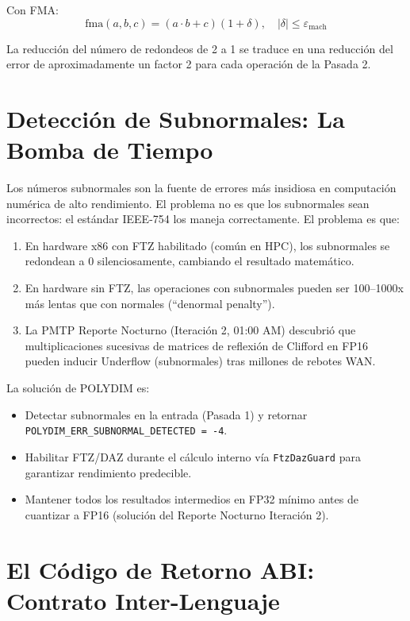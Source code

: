 Con FMA:
\begin{equation}
\text{fma}(a, b, c) = (a \cdot b + c)(1 + \delta), \quad |\delta| \le \varepsilon_{\text{mach}}
\end{equation}

La reducción del número de redondeos de 2 a 1 se traduce en una reducción del error
de aproximadamente un factor 2 para cada operación de la Pasada 2.

\section{Detección de Subnormales: La Bomba de Tiempo}

Los números subnormales son la fuente de errores más insidiosa en computación numérica
de alto rendimiento. El problema no es que los subnormales sean incorrectos: el estándar
IEEE-754 los maneja correctamente. El problema es que:

\begin{enumerate}
\item En hardware x86 con FTZ habilitado (común en HPC), los subnormales se redondean
a 0 silenciosamente, cambiando el resultado matemático.
\item En hardware sin FTZ, las operaciones con subnormales pueden ser 100--1000x más
lentas que con normales (``denormal penalty'').
\item La PMTP Reporte Nocturno (Iteración 2, 01:00 AM) descubrió que multiplicaciones
sucesivas de matrices de reflexión de Clifford en FP16 pueden inducir Underflow
(subnormales) tras millones de rebotes WAN.
\end{enumerate}

La solución de POLYDIM es:
\begin{itemize}
\item Detectar subnormales en la entrada (Pasada 1) y retornar \texttt{POLYDIM\_ERR\_SUBNORMAL\_DETECTED = -4}.
\item Habilitar FTZ/DAZ durante el cálculo interno vía \texttt{FtzDazGuard} para garantizar
rendimiento predecible.
\item Mantener todos los resultados intermedios en FP32 mínimo antes de cuantizar a FP16
(solución del Reporte Nocturno Iteración 2).
\end{itemize}

\section{El Código de Retorno ABI: Contrato Inter-Lenguaje}

